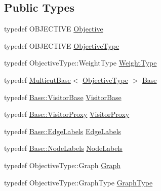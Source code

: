 \subsection*{Public Types}
\begin{DoxyCompactItemize}
\item 
typedef O\+B\+J\+E\+C\+T\+I\+V\+E \hyperlink{classnifty_1_1graph_1_1optimization_1_1multicut_1_1Cgc_ac3e728f92d355814ff3b40b5f7d59123}{Objective}
\item 
typedef O\+B\+J\+E\+C\+T\+I\+V\+E \hyperlink{classnifty_1_1graph_1_1optimization_1_1multicut_1_1Cgc_a10339a861b453cdeb2e85e8371bd013d}{Objective\+Type}
\item 
typedef Objective\+Type\+::\+Weight\+Type \hyperlink{classnifty_1_1graph_1_1optimization_1_1multicut_1_1Cgc_ac8f7c1da4b33561e45fe423f2c12b2b5}{Weight\+Type}
\item 
typedef \hyperlink{classnifty_1_1graph_1_1MulticutBase}{Multicut\+Base}$<$ \hyperlink{classnifty_1_1graph_1_1optimization_1_1multicut_1_1Cgc_a10339a861b453cdeb2e85e8371bd013d}{Objective\+Type} $>$ \hyperlink{classnifty_1_1graph_1_1optimization_1_1multicut_1_1Cgc_acdde87de7bae598ab55182ef49cbf979}{Base}
\item 
typedef \hyperlink{classnifty_1_1graph_1_1MulticutBase_a5882fb69df59d8113f6a81a0dac26eaa}{Base\+::\+Visitor\+Base} \hyperlink{classnifty_1_1graph_1_1optimization_1_1multicut_1_1Cgc_afb4bc97ca8d80719f67fe59823ac9466}{Visitor\+Base}
\item 
typedef \hyperlink{classnifty_1_1graph_1_1MulticutBase_a6ede271a3cb0ae4711a7e9da2b07efa9}{Base\+::\+Visitor\+Proxy} \hyperlink{classnifty_1_1graph_1_1optimization_1_1multicut_1_1Cgc_abcca194a80764ede21e22a9a9dbbddc4}{Visitor\+Proxy}
\item 
typedef \hyperlink{classnifty_1_1graph_1_1MulticutBase_aaeefe3c5df81d9c9efffec878cf2fcd7}{Base\+::\+Edge\+Labels} \hyperlink{classnifty_1_1graph_1_1optimization_1_1multicut_1_1Cgc_ab48f3649332fb4161baf8de03810dcce}{Edge\+Labels}
\item 
typedef \hyperlink{classnifty_1_1graph_1_1MulticutBase_afba61ad2919d0fad20b3745af19309da}{Base\+::\+Node\+Labels} \hyperlink{classnifty_1_1graph_1_1optimization_1_1multicut_1_1Cgc_aec40bb34a73aeff370903e19e4c90ca0}{Node\+Labels}
\item 
typedef Objective\+Type\+::\+Graph \hyperlink{classnifty_1_1graph_1_1optimization_1_1multicut_1_1Cgc_a4737d533c9d4d62c220bb81f5acba0fe}{Graph}
\item 
typedef Objective\+Type\+::\+Graph\+Type \hyperlink{classnifty_1_1graph_1_1optimization_1_1multicut_1_1Cgc_a7954c621d6b0085dac0a0208e8edeb98}{Graph\+Type}

\end{DoxyCompactItemize}
